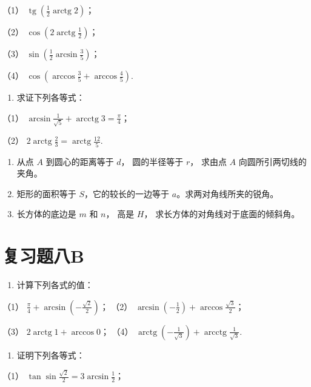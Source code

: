 （1）
\(\operatorname{tg}\left(\frac{1}{2} \operatorname{arctg} 2\right)\)；

（2） \(\cos \left(2\operatorname{arctg} \frac{1}{2}\right)\)；

（3） \(\sin \left(\frac{1}{2} \arcsin \frac{3}{5}\right)\)；

（4） \(\cos \left(\arccos \frac{3}{5} + \arccos \frac{4}{5}\right)\).

\begin{enumerate}[start=5]
\item
  求证下列各等式：
\end{enumerate}

（1）
\(\arcsin \frac{1}{\sqrt{5}} + \operatorname{arcctg} 3 = \frac{\pi}{4}\)；

（2）
\(2\operatorname{arctg} \frac{2}{3} = \operatorname{arctg} \frac{12}{5}\).

\begin{enumerate}[start=6]
\item
  从点 \(A\) 到圆心的距离等于 \(d\)， 圆的半径等于 \(r\)， 求由点 \(A\)
  向圆所引两切线的夹角。
\item
  矩形的面积等于 \(S\)，它的较长的一边等于 \(a\)。求两对角线所夹的锐角。
\item
  长方体的底边是 \(m\) 和 \(n\)， 高是 \(H\)，
  求长方体的对角线对于底面的倾斜角。
\end{enumerate}

\section{复习题八B}

\begin{enumerate}
\item
  计算下列各式的值：
\end{enumerate}

（1） \(\frac{\pi}{4} + \arcsin\left(-\frac{\sqrt{2}}{2}\right)\)；
（2） \(\arcsin\left(-\frac{1}{2}\right) + \arccos\frac{\sqrt{3}}{2}\)；

（3） \(2\operatorname{arctg} 1 + \arccos 0\)； （4）
\(\operatorname{arctg}\left(-\frac{1}{\sqrt{3}}\right) + \operatorname{arcctg}\frac{1}{\sqrt{3}}\).

\begin{enumerate}[start=2]
\item
  证明下列各等式：
\end{enumerate}

（1） \(\tan \sin \frac{\sqrt{2}}{2} = 3 \arcsin \frac{1}{2}\)；

